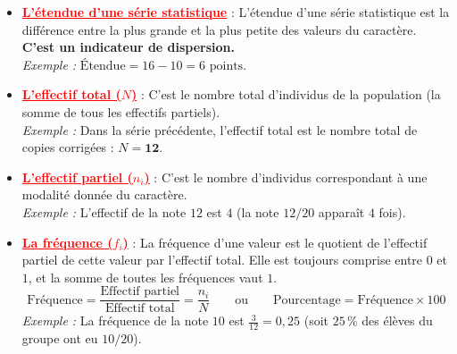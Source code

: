 \documentclass[12pt,a4paper]{article}
\begin{document}
\begin{itemize}
    \textit{Exemple des notes obtenues :} la note minimale est $10$ et la note maximale est $16$.
    \item \textcolor{red}{\textbf{\underline{L'étendue d'une série statistique}}} : L'étendue d'une série statistique est la différence entre la plus grande et la plus petite des valeurs du caractère. \textbf{C'est un indicateur de dispersion.} \\
    \textit{Exemple :} $\text{Étendue} = 16 - 10 = 6\text{ points}$.
    \item \textcolor{red}{\textbf{\underline{L'effectif total ($N$)}}} : C'est le nombre total d'individus de la population (la somme de tous les effectifs partiels). \\
    \textit{Exemple :} Dans la série précédente, l'effectif total est le nombre total de copies corrigées : $N = \mathbf{12}$.
    \item \textcolor{red}{\textbf{\underline{L'effectif partiel ($n_i$)}}} : C'est le nombre d'individus correspondant à une modalité donnée du caractère. \\
    \textit{Exemple :} L'effectif de la note $12$ est $4$ (la note $12/20$ apparaît $4$ fois).
    \item \textcolor{red}{\textbf{\underline{La fréquence ($f_i$)}}} : La fréquence d'une valeur est le quotient de l'effectif partiel de cette valeur par l'effectif total. Elle est toujours comprise entre $0$ et $1$, et la somme de toutes les fréquences vaut $1$.
    \[
        \text{Fréquence} = \frac{\text{Effectif partiel}}{\text{Effectif total}} = \frac{n_i}{N} \qquad \text{ou} \qquad \text{Pourcentage} = \text{Fréquence} \times 100
    \]
    \textit{Exemple :} La fréquence de la note $10$ est $\frac{3}{12} = 0,25$ (soit $25\,\%$ des élèves du groupe ont eu $10/20$).
\end{itemize}
\end{document}
